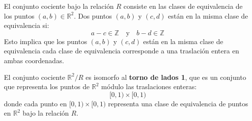\begin{solution}
El conjunto cociente bajo la relación \( R \) consiste en las clases de equivalencia de los puntos \( (a, b) \in \mathbb{R}^2 \). Dos puntos \( (a, b) \) y \( (c, d) \) están en la misma clase de equivalencia si:
\[
a - c \in \mathbb{Z} \quad \text{y} \quad b - d \in \mathbb{Z}
\]
Esto implica que los puntos \( (a, b) \) y \( (c, d) \) están en la misma clase de equivalencia cada clase de equivalencia corresponde a una traslación entera en ambas coordenadas.

El conjunto cociente \( \mathbb{R}^2 / R \) es isomorfo al \textbf{torno de lados 1}, que es un conjunto que representa los puntos de \( \mathbb{R}^2 \) módulo las traslaciones enteras:
\[
[0, 1) \times [0, 1)
\]
donde cada punto en \( [0, 1) \times [0, 1) \) representa una clase de equivalencia de puntos en \( \mathbb{R}^2 \) bajo la relación \( R \).
\end{solution}